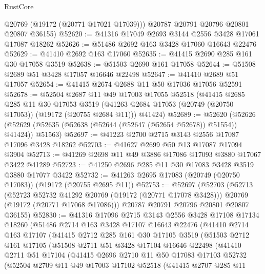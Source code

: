 \begin{lexlean}{RustCore}
\begin{coremodule}
        @20769
        (@19172 (@20771 @17021 @17039)))
      @20787
      @20791
      @20796
      @20801
      @20807
      @36155)
@52620 := @41316 @17049 @2693 @3144 @2556 @3428 @17061 @17087 @18262
@52626 := @51486 @2692 @163 @3428 @17060 @16643 @22476
@52629 := @41410 @2692 @163 @17060
@52635 := @41415 @2690 @285 @161 @30 @17058 @3519
@52638 := @51503 @2690 @161 @17058
@52644 := @51508 @2689 @51 @3428 @17057 @16646 @22498
@52647 := @41410 @2689 @51 @17057
@52654 := @41415 @2674 @2688 @11 @50 @17036 @17056 @52591
@52678 := @52504
    @2687
    @11
    @49
    @17003
    @17055
    @52518
    (@41415
      @2685
      @285
      @11
      @30
      @17053
      @3519
      (@41263 @2684 @17053 (@20749 (@20750 @17053)) (@19172 (@20755 @2684 @11)))
      @41424)
@52689 := @52620
    (@52626 (@52629 (@52635 (@52638 (@52644 (@52647 (@52654 @52678)) @51554)) @41424)) @51563)
@52697 := @41223 @2700 @2715 @3143 @2556 @17087 @17096 @3428 @18262
@52703 := @41627 @2699 @50 @13 @17087 @17094 @3904
@52713 := @41269 @2698 @11 @49 @3886 @17086 @17093 @3880 @17067 @3422 @41289
@52723 := @41250 @2696 @285 @11 @30 @17083 @3428 @3519 @3880 @17077 @3422
@52732 := @41263 @2695 @17083 (@20749 (@20750 @17083)) (@19172 (@20755 @2695 @11))
@52753 := @52697
    (@52703
      (@52713
        (@52723 @52732 @41292 @20769 (@19172 (@20771 @17078 @3428)))
        @20769
        (@19172 (@20771 @17068 @17086)))
      @20787
      @20791
      @20796
      @20801
      @20807
      @36155)
@52830 := @41316
    @17096
    @2715
    @3143
    @2556
    @3428
    @17108
    @17134
    @18260
    (@51486
      @2714
      @163
      @3428
      @17107
      @16643
      @22476
      (@41410
        @2714
        @163
        @17107
        (@41415
          @2712
          @285
          @161
          @30
          @17105
          @3519
          (@51503
            @2712
            @161
            @17105
            (@51508
              @2711
              @51
              @3428
              @17104
              @16646
              @22498
              (@41410
                @2711
                @51
                @17104
                (@41415
                  @2696
                  @2710
                  @11
                  @50
                  @17083
                  @17103
                  @52732
                  (@52504
                    @2709
                    @11
                    @49
                    @17003
                    @17102
                    @52518
                    (@41415
                      @2707
                      @285
                      @11

\end{coremodule}
\end{lexlean}
